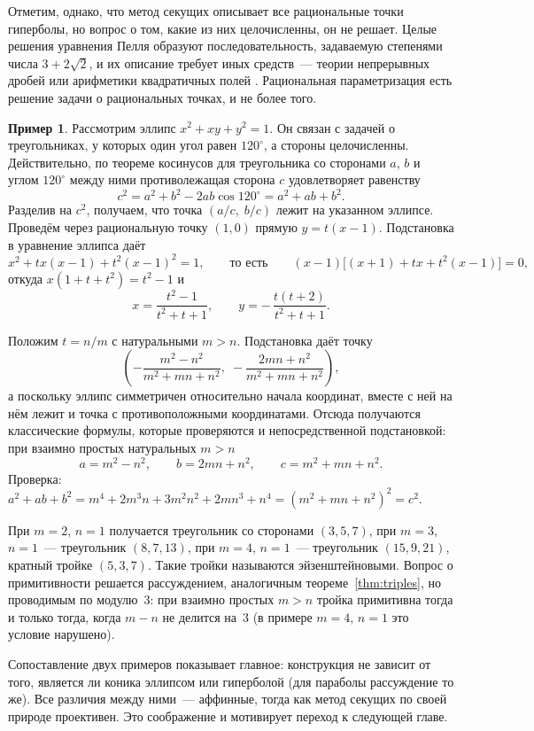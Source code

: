 \documentclass[a4paper,14pt]{extreport}
\theoremstyle{definition}
\newtheorem{exmp}[thm]{Пример}
\begin{document}
Отметим, однако, что метод секущих описывает все рациональные точки
гиперболы, но вопрос о том, какие из них целочисленны, он не решает. Целые
решения уравнения Пелля образуют последовательность, задаваемую степенями числа
$3+2\sqrt2$, и их описание требует иных средств~--- теории непрерывных дробей
или арифметики квадратичных полей \cite[гл.~2]{borevich}. Рациональная параметризация есть решение задачи о
рациональных точках, и не более того.

\begin{exmp}
Рассмотрим эллипс $x^2+xy+y^2=1$. Он связан с задачей о треугольниках, у которых
один угол равен $120^\circ$, а стороны целочисленны. Действительно, по теореме
косинусов для треугольника со сторонами $a$, $b$ и углом $120^\circ$ между ними
противолежащая сторона $c$ удовлетворяет равенству
\[
  c^2=a^2+b^2-2ab\cos 120^\circ=a^2+ab+b^2 .
\]
Разделив на $c^2$, получаем, что точка $(a/c,\;b/c)$ лежит на указанном
эллипсе. Проведём через рациональную точку $(1,0)$ прямую $y=t(x-1)$.
Подстановка в уравнение эллипса даёт
\[
  x^2+tx(x-1)+t^2(x-1)^2=1,\qquad\text{то есть}\qquad
  (x-1)\bigl[(x+1)+tx+t^2(x-1)\bigr]=0,
\]
откуда $x(1+t+t^2)=t^2-1$ и
\[
  x=\frac{t^2-1}{t^2+t+1},\qquad y=-\,\frac{t(t+2)}{t^2+t+1}.
\]
\end{exmp}

Положим $t=n/m$ с натуральными $m>n$. Подстановка даёт точку
\[
  \left(-\frac{m^2-n^2}{m^2+mn+n^2},\;-\frac{2mn+n^2}{m^2+mn+n^2}\right),
\]
а поскольку эллипс симметричен относительно начала координат, вместе с ней на
нём лежит и точка с противоположными координатами. Отсюда получаются
классические формулы, которые проверяются и непосредственной подстановкой: при
взаимно простых натуральных $m>n$
\[
  a=m^2-n^2,\qquad b=2mn+n^2,\qquad c=m^2+mn+n^2 .
\]
Проверка:
$a^2+ab+b^2=m^4+2m^3n+3m^2n^2+2mn^3+n^4=(m^2+mn+n^2)^2=c^2$.

При $m=2$, $n=1$ получается треугольник со сторонами $(3,5,7)$, при $m=3$,
$n=1$~--- треугольник $(8,7,13)$, при $m=4$, $n=1$~--- треугольник $(15,9,21)$,
кратный тройке $(5,3,7)$. Такие тройки называются эйзенштейновыми. Вопрос о
примитивности решается рассуждением, аналогичным теореме~\ref{thm:triples}, но
проводимым по модулю~3: при взаимно простых $m>n$ тройка примитивна тогда и
только тогда, когда $m-n$ не делится на~3 (в примере $m=4$, $n=1$ это условие
нарушено).

Сопоставление двух примеров показывает главное: конструкция не зависит от того,
является ли коника эллипсом или гиперболой (для параболы рассуждение то же). Все различия между
ними~--- аффинные, тогда как метод секущих по своей природе проективен. Это
соображение и мотивирует переход к следующей главе.
\end{document}
